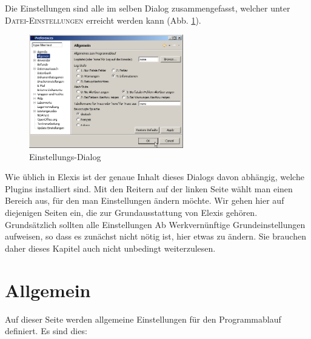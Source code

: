 %

\label{settings}
Die Einstellungen sind alle im selben Dialog zusammengefasst, welcher unter
\textsc{Datei-Einstellungen} erreicht werden kann (Abb. \ref{fig:settingsmain}).
\begin{figure}[htp]
\begin{center}
  \includegraphics[width=0.6\textwidth]{images/settingsmain}
  \caption{Einstellungs-Dialog}
  \label{fig:settingsmain}
\end{center}
\end{figure}


Wie üblich in Elexis ist der genaue Inhalt dieses Dialogs davon abhängig,
welche Plugins installiert sind. Mit den Reitern auf der linken Seite wählt man
einen Bereich aus, für den man Einstellungen ändern möchte. Wir gehen hier auf
diejenigen Seiten ein, die zur Grundausstattung von Elexis gehören. Grundsätzlich
sollten alle Einstellungen \glqq Ab Werk\grqq{}vernünftige Grundeinstellungen
aufweisen, so dass es zunächst nicht nötig ist, hier etwas zu ändern. Sie
brauchen daher dieses Kapitel auch nicht unbedingt weiterzulesen.

\section{Allgemein}
Auf dieser Seite werden allgemeine Einstellungen für den Programmablauf
definiert. Es sind dies:
